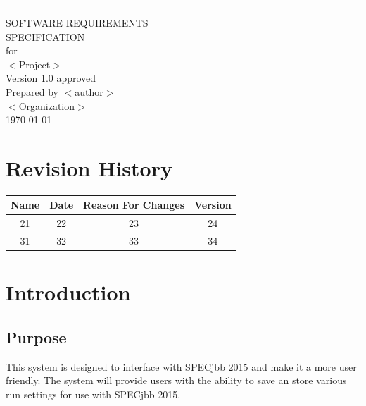 \documentclass{scrreprt}
\date{}
\def\myversion{1.0 }
\begin{document}
\begin{flushright}
    \rule{16cm}{5pt}\vskip1cm
    \begin{bfseries}
        \Huge{SOFTWARE REQUIREMENTS\\ SPECIFICATION}\\
        \vspace{1.9cm}
        for\\
        \vspace{1.9cm}
        $<$Project$>$\\
        \vspace{1.9cm}
        \LARGE{Version \myversion approved}\\
        \vspace{1.9cm}
        Prepared by $<$author$>$\\
        \vspace{1.9cm}
        $<$Organization$>$\\
        \vspace{1.9cm}
        \today\\
    \end{bfseries}
\end{flushright}

\tableofcontents


\chapter*{Revision History}

\begin{center}
    \begin{tabular}{|c|c|c|c|}
        \hline
	    Name & Date & Reason For Changes & Version\\
        \hline
	    21 & 22 & 23 & 24\\
        \hline
	    31 & 32 & 33 & 34\\
        \hline
    \end{tabular}
\end{center}

\chapter{Introduction}

\section{Purpose}
This system is designed to interface with SPECjbb 2015 and make it a more user friendly.  The system will provide users with the ability to save an store various run settings for use with SPECjbb 2015. 
\end{document}
